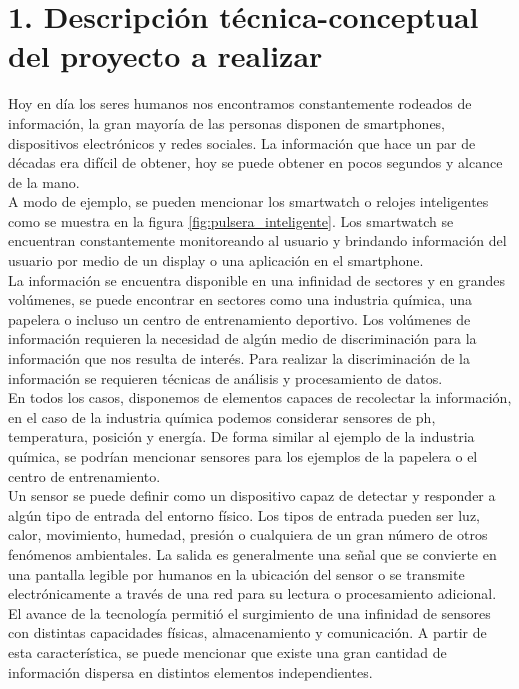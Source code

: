 \documentclass[
11pt, %
]{charter}
\begin{document}
\section{1. Descripción técnica-conceptual del proyecto a realizar}
\label{sec:descripcion}

Hoy en día los seres humanos nos encontramos constantemente rodeados de información, la gran mayoría de las personas disponen de smartphones, dispositivos electrónicos y redes sociales. La información que hace un par de décadas era difícil de obtener, hoy se puede obtener en pocos segundos y alcance de la mano.\\
A modo de ejemplo, se pueden mencionar los smartwatch o relojes inteligentes como se muestra en la figura \ref{fig:pulsera_inteligente}. Los smartwatch se encuentran constantemente monitoreando al usuario y brindando información del usuario por medio de un display o una aplicación en el smartphone.\\
La información se encuentra disponible en una infinidad de sectores y en grandes volúmenes, se puede encontrar en sectores como una industria química, una papelera o incluso un centro de entrenamiento deportivo.
Los volúmenes de información requieren la necesidad de algún medio de discriminación para la información que nos resulta de interés. Para realizar la discriminación de la información se requieren técnicas de análisis y procesamiento de datos.\\
En todos los casos, disponemos de elementos capaces de recolectar la información, en el caso de la industria química podemos considerar sensores de ph, temperatura, posición y energía. De forma similar al ejemplo de la industria química, se podrían mencionar sensores para los ejemplos de la papelera o el centro de entrenamiento.\\
Un sensor se puede definir como un dispositivo capaz de detectar y responder a algún tipo de entrada del entorno físico. Los tipos de entrada pueden ser luz, calor, movimiento, humedad, presión o cualquiera de un gran número de otros fenómenos ambientales. La salida es generalmente una señal que se convierte en una pantalla legible por humanos en la ubicación del sensor o se transmite electrónicamente a través de una red para su lectura o procesamiento adicional. \\
El avance de la tecnología permitió el surgimiento de una infinidad de sensores con distintas capacidades físicas, almacenamiento y comunicación. A partir de esta característica, se puede mencionar que existe una gran cantidad de información dispersa en distintos elementos independientes.\\
\end{document}
